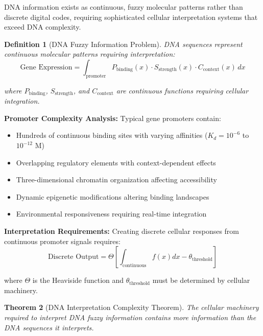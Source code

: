 \documentclass[12pt,a4paper]{article}
\newtheorem{theorem}{Theorem}[section]
\newtheorem{definition}[theorem]{Definition}
\begin{document}
DNA information exists as continuous, fuzzy molecular patterns rather than discrete digital codes, requiring sophisticated cellular interpretation systems that exceed DNA complexity.

\begin{definition}[DNA Fuzzy Information Problem]
DNA sequences represent continuous molecular patterns requiring interpretation:
$$\text{Gene Expression} = \int_{\text{promoter}} P_{\text{binding}}(x) \cdot S_{\text{strength}}(x) \cdot C_{\text{context}}(x) \, dx$$

where $P_{\text{binding}}$, $S_{\text{strength}}$, and $C_{\text{context}}$ are continuous functions requiring cellular integration.
\end{definition}

\textbf{Promoter Complexity Analysis:}
Typical gene promoters contain:
\begin{itemize}
\item Hundreds of continuous binding sites with varying affinities ($K_d = 10^{-6}$ to $10^{-12}$ M)
\item Overlapping regulatory elements with context-dependent effects
\item Three-dimensional chromatin organization affecting accessibility
\item Dynamic epigenetic modifications altering binding landscapes
\item Environmental responsiveness requiring real-time integration
\end{itemize}

\textbf{Interpretation Requirements:}
Creating discrete cellular responses from continuous promoter signals requires:
$$\text{Discrete Output} = \Theta\left[\int_{\text{continuous}} f(x) dx - θ_{\text{threshold}}\right]$$

where $\Theta$ is the Heaviside function and $θ_{\text{threshold}}$ must be determined by cellular machinery.

\begin{theorem}[DNA Interpretation Complexity Theorem]
The cellular machinery required to interpret DNA fuzzy information contains more information than the DNA sequences it interprets.
\end{theorem}
\end{document}
